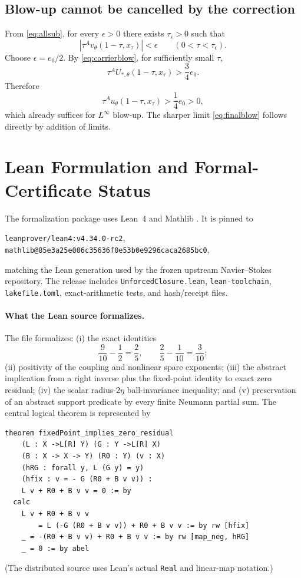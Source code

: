 \documentclass[11pt]{article}
\numberwithin{equation}{section}
\begin{document}
\subsection{Blow-up cannot be cancelled by the correction}
From \eqref{eq:allsub}, for every \(\epsilon>0\) there exists \(\tau_\epsilon>0\) such that
\begin{equation}
\left|\tau^A v_\theta(1-\tau,x_\tau)\right|<\epsilon
\qquad(0<\tau<\tau_\epsilon).
\label{eq:epssub}
\end{equation}
Choose \(\epsilon=e_0/2\).  By \eqref{eq:carrierblow}, for sufficiently small \(\tau\),
\begin{equation}
\tau^A U_{*,\theta}(1-\tau,x_\tau)>\frac34e_0.
\label{eq:carrierlower}
\end{equation}
Therefore
\begin{equation}
\tau^A u_\theta(1-\tau,x_\tau)>\frac14e_0>0,
\label{eq:finallower}
\end{equation}
which already suffices for \(L^\infty\) blow-up.  The sharper limit \eqref{eq:finalblow} follows directly by addition of limits.

\section{Lean Formulation and Formal-Certificate Status}\label{app:lean}

The formalization package uses Lean~4 and Mathlib \cite{deMouraUllrich2021,Mathlib2020}.  It is pinned to
\begin{center}
\texttt{leanprover/lean4:v4.34.0-rc2},\qquad
\texttt{mathlib@85e3a25e006c35636f0e53b0e9296caca2685bc0},
\end{center}
matching the Lean generation used by the frozen upstream Navier--Stokes repository.  The release includes \texttt{UnforcedClosure.lean}, \texttt{lean-toolchain}, \texttt{lakefile.toml}, exact-arithmetic tests, and hash/receipt files.

\paragraph{What the Lean source formalizes.}
The file formalizes: (i) the exact identities
\[
\frac9{10}-\frac12=\frac25,
\qquad
\frac25-\frac1{10}=\frac3{10};
\]
(ii) positivity of the coupling and nonlinear spare exponents; (iii) the abstract implication from a right inverse plus the fixed-point identity to exact zero residual; (iv) the scalar radius-$2\eta$ ball-invariance inequality; and (v) preservation of an abstract support predicate by every finite Neumann partial sum.  The central logical theorem is represented by
\begin{lstlisting}[language={}]
theorem fixedPoint_implies_zero_residual
    (L : X ->L[R] Y) (G : Y ->L[R] X)
    (B : X -> X -> Y) (R0 : Y) (v : X)
    (hRG : forall y, L (G y) = y)
    (hfix : v = - G (R0 + B v v)) :
    L v + R0 + B v v = 0 := by
  calc
    L v + R0 + B v v
        = L (-G (R0 + B v v)) + R0 + B v v := by rw [hfix]
    _ = -(R0 + B v v) + R0 + B v v := by rw [map_neg, hRG]
    _ = 0 := by abel
\end{lstlisting}
(The distributed source uses Lean's actual \texttt{Real} and linear-map notation.)
\end{document}
